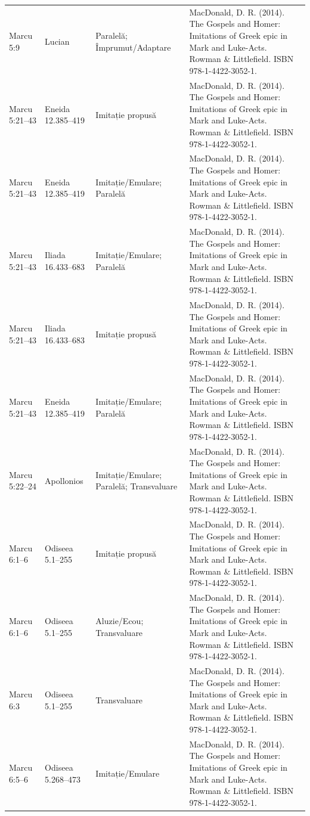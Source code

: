 \documentclass[12pt,a4paper,twoside,openany]{book}
\begin{document}
\begin{longtable}{L{1.4cm}L{1.7cm}L{3.1cm}L{8.4cm}}
Marcu 5:9 & Lucian & Paralelă; Împrumut/Adaptare & MacDonald, D. R. (2014). The Gospels and Homer: Imitations of Greek epic in Mark and Luke-Acts. Rowman \& Littlefield. ISBN 978-1-4422-3052-1. \\
Marcu 5:21–43 & Eneida 12.385–419 & Imitație propusă & MacDonald, D. R. (2014). The Gospels and Homer: Imitations of Greek epic in Mark and Luke-Acts. Rowman \& Littlefield. ISBN 978-1-4422-3052-1. \\
Marcu 5:21–43 & Eneida 12.385–419 & Imitație/Emulare; Paralelă & MacDonald, D. R. (2014). The Gospels and Homer: Imitations of Greek epic in Mark and Luke-Acts. Rowman \& Littlefield. ISBN 978-1-4422-3052-1. \\
Marcu 5:21–43 & Iliada 16.433–683 & Imitație/Emulare; Paralelă & MacDonald, D. R. (2014). The Gospels and Homer: Imitations of Greek epic in Mark and Luke-Acts. Rowman \& Littlefield. ISBN 978-1-4422-3052-1. \\
Marcu 5:21–43 & Iliada 16.433–683 & Imitație propusă & MacDonald, D. R. (2014). The Gospels and Homer: Imitations of Greek epic in Mark and Luke-Acts. Rowman \& Littlefield. ISBN 978-1-4422-3052-1. \\
Marcu 5:21–43 & Eneida 12.385–419 & Imitație/Emulare; Paralelă & MacDonald, D. R. (2014). The Gospels and Homer: Imitations of Greek epic in Mark and Luke-Acts. Rowman \& Littlefield. ISBN 978-1-4422-3052-1. \\
Marcu 5:22–24 & Apollonios & Imitație/Emulare; Paralelă; Transvaluare & MacDonald, D. R. (2014). The Gospels and Homer: Imitations of Greek epic in Mark and Luke-Acts. Rowman \& Littlefield. ISBN 978-1-4422-3052-1. \\
Marcu 6:1–6 & Odiseea 5.1–255 & Imitație propusă & MacDonald, D. R. (2014). The Gospels and Homer: Imitations of Greek epic in Mark and Luke-Acts. Rowman \& Littlefield. ISBN 978-1-4422-3052-1. \\
Marcu 6:1–6 & Odiseea 5.1–255 & Aluzie/Ecou; Transvaluare & MacDonald, D. R. (2014). The Gospels and Homer: Imitations of Greek epic in Mark and Luke-Acts. Rowman \& Littlefield. ISBN 978-1-4422-3052-1. \\
Marcu 6:3 & Odiseea 5.1–255 & Transvaluare & MacDonald, D. R. (2014). The Gospels and Homer: Imitations of Greek epic in Mark and Luke-Acts. Rowman \& Littlefield. ISBN 978-1-4422-3052-1. \\
Marcu 6:5–6 & Odiseea 5.268–473 & Imitație/Emulare & MacDonald, D. R. (2014). The Gospels and Homer: Imitations of Greek epic in Mark and Luke-Acts. Rowman \& Littlefield. ISBN 978-1-4422-3052-1. \\

\end{longtable}
\end{document}
